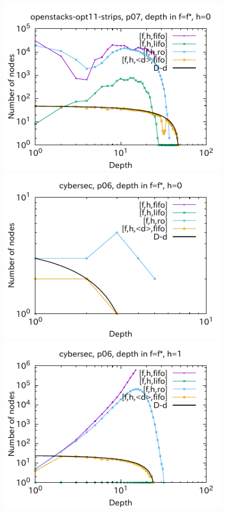 \begin{figure}[htbp]
\includegraphics{img/output-lmcut/openstacks-opt11-strips/p07-0.pdf}
\includegraphics{img/output-lmcut/cybersec/p06-0.pdf}
\includegraphics{img/output-lmcut/cybersec/p06-1.pdf}

\end{figure}
